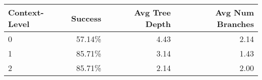 \begin{tabular}{lrrr}
\toprule
Context-Level & Success & Avg Tree Depth & Avg Num Branches \\
\midrule
0 & 57.14\% & 4.43 & 2.14 \\
1 & 85.71\% & 3.14 & 1.43 \\
2 & 85.71\% & 2.14 & 2.00 \\
\bottomrule
\end{tabular}
